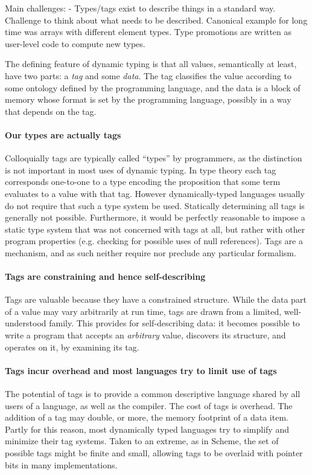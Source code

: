 \documentclass[pldi]{sigplanconf-pldi15}
\begin{document}
Main challenges:
- Types/tags exist to describe things in a standard way. Challenge to think
about what needs to be described. Canonical example for long time was arrays
with different element types.
Type promotions are written as user-level code to compute new types.

The defining feature of dynamic typing is that all values, semantically at
least, have two parts: a \emph{tag} and some \emph{data}. The tag classifies
the value according to some ontology defined by the programming language, and
the data is a block of memory whose format is set by the programming language,
possibly in a way that depends on the tag.

\paragraph{Our types are actually tags}
Colloquially tags are typically called ``types'' by programmers, as the distinction
is not important in most uses of dynamic typing. In type theory each tag corresponds
one-to-one to a type encoding the proposition that some term evaluates to a value
with that tag. However dynamically-typed languages usually do not require that such
a type system be used. Statically determining all tags is generally not possible.
Furthermore, it would be perfectly reasonable to impose a static type system that
was not concerned with tags at all, but rather with other program properties
(e.g. checking for possible uses of null references). Tags are a mechanism, and as
such neither require nor preclude any particular formalism.

\paragraph{Tags are constraining and hence self-describing}
Tags are valuable because they have a constrained structure. While the data
part of a value may vary arbitrarily at run time, tags are drawn from a limited,
well-understood family. This provides for self-describing data: it becomes possible
to write a program that accepts an \emph{arbitrary} value, discovers its structure,
and operates on it, by examining its tag.

\paragraph{Tags incur overhead and most languages try to limit use of tags}
The potential of tags is to provide a common descriptive language shared by all users
of a language, as well as the compiler. The cost of tags is overhead. The addition of
a tag may double, or more, the memory footprint of a data item. Partly for this reason,
most dynamically typed languages try to simplify and minimize their tag systems.
 Taken to an extreme,
as in Scheme, the set of possible tags might be finite and small, allowing tags to be
overlaid with pointer bits in many implementations.
\end{document}
